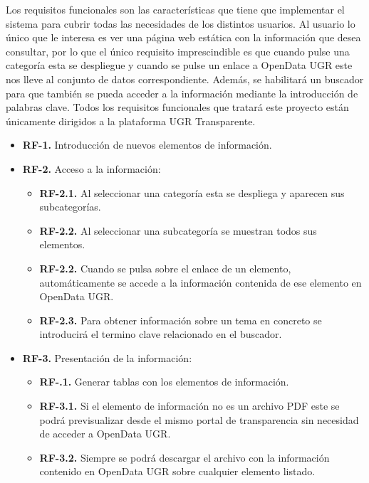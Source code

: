 Los requisitos funcionales son las características que tiene que implementar el sistema para cubrir todas las necesidades de 
los distintos usuarios. Al usuario lo único que le interesa es ver una página web estática con la información que desea 
consultar, por lo que el único requisito imprescindible es que cuando pulse una categoría esta se despliegue y cuando se 
pulse un enlace a OpenData UGR este nos lleve al conjunto de datos correspondiente. Además, se habilitará un buscador para que
también se pueda acceder a la información mediante la introducción de palabras clave. Todos los requisitos funcionales que 
tratará este proyecto están únicamente dirigidos a la plataforma UGR Transparente.

\begin{itemize}
  \item \textbf{RF-1.} Introducción de nuevos elementos de información.
\end{itemize}

\begin{itemize}
  \item \textbf{RF-2.} Acceso a la información:
  \begin{itemize}
    \item \textbf{RF-2.1.} Al seleccionar una categoría esta se despliega y aparecen sus subcategorías.
    \item \textbf{RF-2.2.} Al seleccionar una subcategoría se muestran todos sus elementos.
    \item \textbf{RF-2.2.} Cuando se pulsa sobre el enlace de un elemento, automáticamente se accede a la información contenida 
    de ese elemento en OpenData UGR.
    \item \textbf{RF-2.3.} Para obtener información sobre un tema en concreto se introducirá el termino clave relacionado en 
    el buscador.
    \end{itemize}
\end{itemize}

\begin{itemize}
  \item \textbf{RF-3.} Presentación de la información:
  \begin{itemize}
    \item \textbf{RF-.1.} Generar tablas con los elementos de información.
    \item \textbf{RF-3.1.} Si el elemento de información no es un archivo PDF este se podrá previsualizar desde el mismo portal
    de transparencia sin necesidad de acceder a OpenData UGR.
    \item \textbf{RF-3.2.} Siempre se podrá descargar el archivo con la información contenido en OpenData UGR sobre cualquier 
    elemento listado.
  \end{itemize}
\end{itemize}
	
